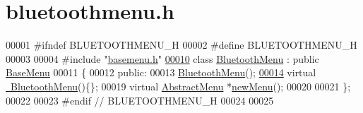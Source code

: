 \hypertarget{bluetoothmenu_8h_source}{}\section{bluetoothmenu.\+h}
\label{bluetoothmenu_8h_source}

\begin{DoxyCode}
00001 \textcolor{preprocessor}{#ifndef BLUETOOTHMENU\_H}
00002 \textcolor{preprocessor}{#define BLUETOOTHMENU\_H}
00003 
00004 \textcolor{preprocessor}{#include "\hyperlink{basemenu_8h}{basemenu.h}"}
\hypertarget{bluetoothmenu_8h_source.tex_l00010}{}\hyperlink{classBluetoothMenu}{00010} \textcolor{keyword}{class }\hyperlink{classBluetoothMenu}{BluetoothMenu} : \textcolor{keyword}{public} \hyperlink{classBaseMenu}{BaseMenu}
00011 \{
00012 \textcolor{keyword}{public}:
00013     \hyperlink{classBluetoothMenu_a164151dbccd288a092ddd35f23dfd778}{BluetoothMenu}();
\hypertarget{bluetoothmenu_8h_source.tex_l00014}{}\hyperlink{classBluetoothMenu_aa8665ebed9b5bdb0fb9bcb83346ef1ce}{00014}     \textcolor{keyword}{virtual} \hyperlink{classBluetoothMenu_aa8665ebed9b5bdb0fb9bcb83346ef1ce}{~BluetoothMenu}()\{\};
00019     \textcolor{keyword}{virtual} \hyperlink{classAbstractMenu}{AbstractMenu} *\hyperlink{classBluetoothMenu_a0fd16ad5a39ce3624613ad7834a55565}{newMenu}();
00020 
00021 \};
00022 
00023 \textcolor{preprocessor}{#endif // BLUETOOTHMENU\_H}
00024 
00025 
\end{DoxyCode}
